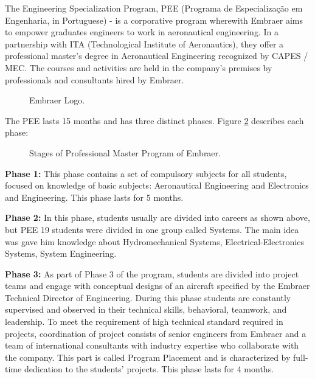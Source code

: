 The Engineering Specialization Program, PEE (Programa de Especialização em
Engenharia, in Portuguese) - is a corporative program wherewith Embraer aims to empower
graduates engineers to work in aeronautical engineering. In a partnership with ITA
(Technological Institute of Aeronautics), they offer a professional master's degree in
Aeronautical Engineering recognized by CAPES / MEC. The courses and activities are
held in the company's premises by professionals and consultants hired by Embraer.

\begin{figure}[H] %
\caption{Embraer Logo.}
\label{fig:EmbraerPEELogo}
\end{figure}

The PEE lasts 15 months and has three distinct phases. Figure \ref{fig:PEEPhases} describes each
phase:

\begin{figure}[H] %
\caption{Stages of Professional Master Program of Embraer.}
\label{fig:PEEPhases}
\end{figure}

\textbf{Phase 1:} This phase contains a set of compulsory subjects for all students,
focused on knowledge of basic subjects: Aeronautical Engineering and Electronics and
Engineering. This phase lasts for 5 months.

\textbf{Phase 2:} In this phase, students usually are divided into careers as shown above,
but PEE 19 students were divided in one group called Systems. The main idea was
gave him knowledge about Hydromechanical Systems, Electrical-Electronics Systems,
System Engineering.

\textbf{Phase 3:} As part of Phase 3 of the program, students are divided into project
teams and engage with conceptual designs of an aircraft specified by the Embraer
Technical Director of Engineering. During this phase students are constantly supervised
and observed in their technical skills, behavioral, teamwork, and leadership. To meet the
requirement of high technical standard required in projects, coordination of project
consists of senior engineers from Embraer and a team of international consultants with
industry expertise who collaborate with the company. This part is called Program
Placement and is characterized by full-time dedication to the students' projects. This
phase lasts for 4 months.

